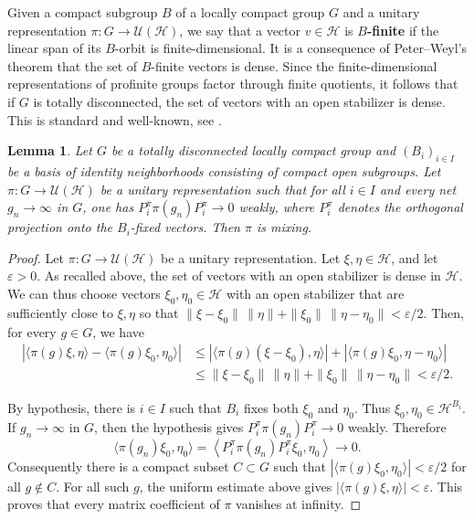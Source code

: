 \documentclass[12pt,a4paper]{amsproc}
\newtheorem{lemma}[theorem]{Lemma}
\theoremstyle{definition}
\newcommand{\cH}{\mathcal H}
\newcommand{\cU}{\mathcal U}
\begin{document}
Given a compact subgroup $B$ of a locally compact group $G$ and a unitary representation $\pi \colon G\to\cU(\cH)$, we say that a vector $v \in \cH$ is \textbf{$B$-finite} if the linear span of its $B$-orbit is finite-dimensional. It is a consequence of Peter--Weyl's theorem that the set of $B$-finite vectors is dense. Since the finite-dimensional representations of profinite groups factor through finite quotients, it follows that if $G$ is totally disconnected, the set of vectors with an open stabilizer is dense. This is standard and well-known,  see \cite[Lemma~1.1]{SemalOlshanskii}.



\begin{lemma}
\label{lem:finite-depth-HM}
Let $G$ be a   totally disconnected locally compact group and $(B_i)_{i \in I}$ be a basis of identity neighborhoods consisting of compact open subgroups. 
Let 
\(\pi \colon G\to\mathcal U(\mathcal H)\) be a unitary representation such that for all $i \in I$  and every net
\(g_n\to\infty\) in \(G\), one has
\(P_i^\pi\pi(g_n)P_i^\pi\to 0\) weakly, where $P^{\pi}_i$ denotes the orthogonal projection onto the $B_i$-fixed vectors.
Then $\pi$ is mixing.
\end{lemma}

\begin{proof}
Let \(\pi \colon G\to\mathcal U(\mathcal H)\) be a unitary
representation. Let \(\xi,\eta\in\mathcal H\), and let \(\varepsilon>0\). As recalled above, the set of  vectors with an open stabilizer is  dense in
\(\mathcal H\). We can thus choose vectors
\(\xi_0,\eta_0\in\mathcal H\) with an open stabilizer that are sufficiently close to $\xi, \eta$ so that
$
\|\xi-\xi_0\|\,\|\eta\|+\|\xi_0\|\,\|\eta-\eta_0\|
<
\varepsilon/2.
$
Then, for every \(g\in G\), we have
\[
\begin{aligned}
\left|
\langle \pi(g)\xi,\eta\rangle
-
\langle \pi(g)\xi_0,\eta_0\rangle
\right|
&\leq
\left|\langle \pi(g)(\xi-\xi_0),\eta\rangle\right|
+
\left|\langle \pi(g)\xi_0,\eta-\eta_0\rangle\right| \\
&\leq
\|\xi-\xi_0\|\,\|\eta\|
+
\|\xi_0\|\,\|\eta-\eta_0\| < \varepsilon/2.
\end{aligned}
\]

By hypothesis, there is $i \in I$ such that $B_i$ fixes both $\xi_0$ and $\eta_0$. 
Thus \(\xi_0,\eta_0\in\mathcal H^{B_i}\). If \(g_n\to\infty\) in \(G\),
then the hypothesis gives
$
P_i^\pi\pi(g_n)P_i^\pi\to 0
$
weakly. Therefore
$$
\langle \pi(g_n)\xi_0,\eta_0\rangle
=
\left\langle
P_i^\pi\pi(g_n)P_i^\pi \xi_0,\eta_0
\right\rangle
\to 0.
$$
Consequently there is a compact subset \(C\subset G\) such that
$
\left|\langle \pi(g)\xi_0,\eta_0\rangle\right|
<
\varepsilon/2
$
for all \(g\notin C\). For all such \(g\), the uniform estimate above gives
$
\left|\langle \pi(g)\xi,\eta\rangle\right|
<
\varepsilon.
$
This proves that every matrix coefficient of \(\pi\) vanishes at infinity. 
\end{proof}
\end{document}
